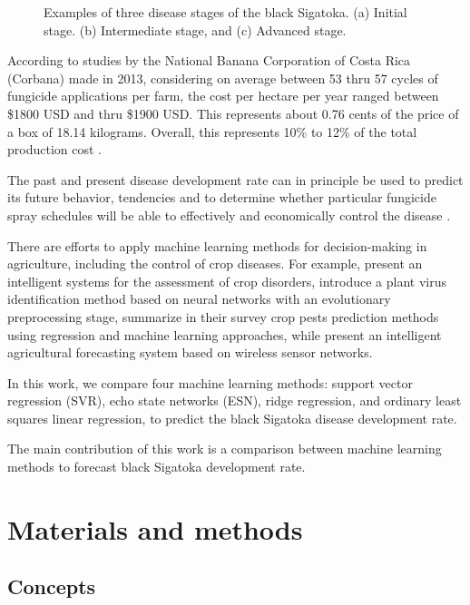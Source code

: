 \documentclass[review]{elsarticle}
\begin{document}
\begin{figure}[h]
\begin{subfigure}{.3\textwidth}
  \caption{}
  \label{fig:sfig3}
\end{subfigure}
\caption{Examples of three disease stages of the black Sigatoka. (a) Initial stage. (b) Intermediate stage, and (c) Advanced stage.} 
\label{figura1} 
\end{figure}

According to studies by the National Banana Corporation of Costa Rica
(Corbana) made in 2013, considering on average between 53 thru 57
cycles of fungicide applications per farm, the cost per hectare per
year ranged between \$1800 USD and thru \$1900 USD. This represents
about 0.76 cents of the price of a box of 18.14 kilograms. Overall,
this represents 10\% to 12\% of the total production cost
\citet{Bresciani2015}.

The past and present disease development rate can in principle be used
to predict its future behavior, tendencies and to determine whether
particular fungicide spray schedules will be able to effectively and
economically control the disease \citet{ChuangJeger1987}.

There are efforts to apply machine learning methods for
decision-making in agriculture, including the control of crop
diseases. For example, \cite{Camargo2012} present an intelligent
systems for the assessment of crop disorders, \cite{Huang2010}
introduce a plant virus identification method based on neural networks
with an evolutionary preprocessing stage, \cite{Kim2014} summarize in
their survey crop pests prediction methods using regression and
machine learning approaches, while \cite{Zhao2013} present an
intelligent agricultural forecasting system based on wireless sensor
networks.

In this work, we compare four machine learning methods: support vector
regression (SVR), echo state networks (ESN), ridge regression, and
ordinary least squares linear regression, to predict the black
Sigatoka disease development rate.

The main contribution of this work is a comparison between machine
learning methods to forecast black Sigatoka development rate.


\section{Materials and methods}

\subsection{Concepts}
\end{document}
